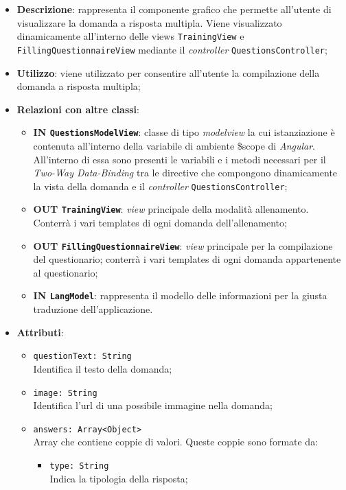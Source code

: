 		\begin{itemize}
			\item \textbf{Descrizione}: rappresenta il componente grafico che permette all'utente di visualizzare la domanda a risposta multipla. Viene visualizzato dinamicamente all'interno delle views \texttt{TrainingView} e \texttt{FillingQuestionnaireView} mediante il \textit{controller} \texttt{QuestionsController};
			\item \textbf{Utilizzo}: viene utilizzato per consentire all'utente la compilazione della domanda a risposta multipla;
			\item \textbf{Relazioni con altre classi}: 
			\begin{itemize}
				\item \textbf{IN \texttt{QuestionsModelView}}: classe di tipo \textit{modelview} la cui istanziazione è contenuta all'interno della variabile di ambiente \$scope di \textit{Angular}. All'interno di essa sono presenti le variabili e i metodi necessari per il \textit{Two-Way Data-Binding} tra le directive che compongono dinamicamente la vista della domanda e il \textit{controller} \texttt{QuestionsController};
				\item \textbf{OUT \texttt{TrainingView}}: \textit{view} principale della modalità allenamento. Conterrà i vari templates di ogni domanda dell'allenamento;
				\item \textbf{OUT \texttt{FillingQuestionnaireView}}: \textit{view} principale per la compilazione del questionario; conterrà i vari templates di ogni domanda appartenente al questionario;   
				\item \textbf{IN \texttt{LangModel}}: rappresenta il modello delle informazioni per la giusta traduzione dell'applicazione.
			\end{itemize}
			\item \textbf{Attributi}:
			\begin{itemize}
				\item \texttt{questionText: String} \\ Identifica il testo della domanda;
				\item \texttt{image: String} \\ Identifica l'url di una possibile immagine nella domanda;
				\item \texttt{answers: Array<Object>}\\ Array che contiene coppie di valori. Queste coppie sono formate da:
				\begin{itemize}
					\item \texttt{type: String} \\ Indica la tipologia della risposta;

\end{itemize}
\end{itemize}
\end{itemize}
